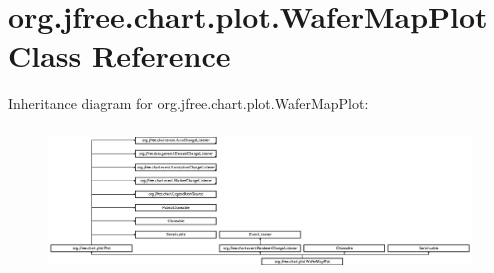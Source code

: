 \hypertarget{classorg_1_1jfree_1_1chart_1_1plot_1_1_wafer_map_plot}{}\section{org.\+jfree.\+chart.\+plot.\+Wafer\+Map\+Plot Class Reference}
\label{classorg_1_1jfree_1_1chart_1_1plot_1_1_wafer_map_plot}
Inheritance diagram for org.\+jfree.\+chart.\+plot.\+Wafer\+Map\+Plot\+:\begin{figure}[H]
\begin{center}
\leavevmode
\includegraphics[height=3.862069cm]{classorg_1_1jfree_1_1chart_1_1plot_1_1_wafer_map_plot}
\end{center}
\end{figure}
